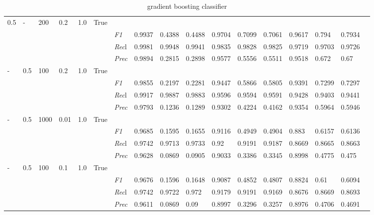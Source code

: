 \begin{table}[]
\begin{tabularx}{\textwidth}{XXXXXX|X|XXX|XXX|XXXX}
0.5 & - & 200 & 0.2 & 1.0 &True & & & & & & & & & \\
& & & & & & \textit{F1} & 0.9937 & 0.4388 & 0.4488 & 0.9704 & 0.7099        & 0.7061        & 0.9617        & 0.794        & 0.7934        \\
& & & & & & \textit{Rec}l & 0.9981 & 0.9948 & 0.9941    & 0.9835 & 0.9828    & 0.9825    & 0.9719    & 0.9703    & 0.9726    \\
& & & & & & \textit{Prec} & 0.9894 & 0.2815 & 0.2898 & 0.9577 & 0.5556 & 0.5511 & 0.9518 & 0.672 & 0.67 \\ \midrule
- & 0.5 & 100 & 0.2 & 1.0 &True & & & & & & & & & \\
& & & & & & \textit{F1} & 0.9855 & 0.2197 & 0.2281 & 0.9447 & 0.5866        & 0.5805        & 0.9391        & 0.7299        & 0.7297        \\
& & & & & & \textit{Rec}l & 0.9917 & 0.9887 & 0.9883    & 0.9596 & 0.9594    & 0.9591    & 0.9428    & 0.9403    & 0.9441    \\
& & & & & & \textit{Prec} & 0.9793 & 0.1236 & 0.1289 & 0.9302 & 0.4224 & 0.4162 & 0.9354 & 0.5964 & 0.5946 \\ \midrule
- & 0.5 & 1000 & 0.01 & 1.0 &True & & & & & & & & & \\
& & & & & & \textit{F1} & 0.9685 & 0.1595 & 0.1655 & 0.9116 & 0.4949        & 0.4904        & 0.883        & 0.6157        & 0.6136        \\
& & & & & & \textit{Rec}l & 0.9742 & 0.9713 & 0.9733    & 0.92 & 0.9191    & 0.9187    & 0.8669    & 0.8665    & 0.8663    \\
& & & & & & \textit{Prec} & 0.9628 & 0.0869 & 0.0905 & 0.9033 & 0.3386 & 0.3345 & 0.8998 & 0.4775 & 0.475 \\ \midrule
- & 0.5 & 100 & 0.1 & 1.0 &True & & & & & & & & & \\
& & & & & & \textit{F1} & 0.9676 & 0.1596 & 0.1648 & 0.9087 & 0.4852        & 0.4807        & 0.8824        & 0.61        & 0.6094        \\
& & & & & & \textit{Rec}l & 0.9742 & 0.9722 & 0.972    & 0.9179 & 0.9191    & 0.9169    & 0.8676    & 0.8669    & 0.8693    \\
& & & & & & \textit{Prec} & 0.9611 & 0.0869 & 0.09 & 0.8997 & 0.3296 & 0.3257 & 0.8976 & 0.4706 & 0.4691 \\ \midrule
\end{tabularx}
\caption{gradient boosting classifier}
\label{tab:all_results_gradient_boosting_classifier}
\end{table}

